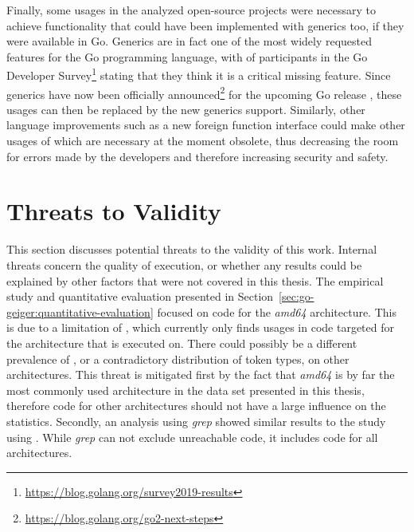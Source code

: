 Finally, some \unsafe{} usages in the analyzed open-source projects were necessary to achieve functionality that could
have been implemented with generics too, if they were available in Go.
Generics are in fact one of the most widely requested features for the Go programming language, with  of
participants in the  Go Developer Survey\footnote{\url{https://blog.golang.org/survey2019-results}}
stating that they think it is a critical missing feature.
Since generics have now been officially announced\footnote{\url{https://blog.golang.org/go2-next-steps}} for the
upcoming Go release , these \unsafe{} usages can then be replaced by the new generics support.
Similarly, other language improvements such as a new foreign function interface could make other usages of \unsafe{}
which are necessary at the moment obsolete, thus decreasing the room for errors made by the developers and therefore
increasing security and safety.



\section{Threats to Validity}\label{sec:discussion:threats-to-validity}

This section discusses potential threats to the validity of this work.
Internal threats concern the quality of execution, or whether any results could be explained by other factors that were
not covered in this thesis.
The empirical study and quantitative evaluation presented in Section~\ref{sec:go-geiger:quantitative-evaluation}
focused on code for the \textit{amd64} architecture.
This is due to a limitation of \toolGeiger{}, which currently only finds \unsafe{} usages in code targeted for the
architecture that \toolGeiger{} is executed on.
There could possibly be a different prevalence of \unsafe{}, or a contradictory distribution of \unsafe{} token types,
on other architectures.
This threat is mitigated first by the fact that \textit{amd64} is by far the most commonly used architecture in the
data set presented in this thesis, therefore code for other architectures should not have a large influence on the
statistics.
Secondly, an analysis using \textit{grep} showed similar results to the study using \toolGeiger{}.
While \textit{grep} can not exclude unreachable code, it includes code for all architectures.

